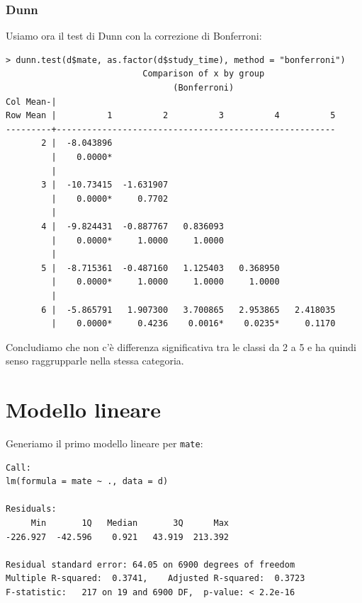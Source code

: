 \documentclass{beamer}
\begin{document}
\begin{frame}[fragile]
\frametitle{Dunn}
Usiamo ora il test di Dunn con la correzione di Bonferroni:
{\tiny
\begin{verbatim}
> dunn.test(d$mate, as.factor(d$study_time), method = "bonferroni")
                           Comparison of x by group                            
                                 (Bonferroni)                                  
Col Mean-|
Row Mean |          1          2          3          4          5
---------+-------------------------------------------------------
       2 |  -8.043896
         |    0.0000*
         |
       3 |  -10.73415  -1.631907
         |    0.0000*     0.7702
         |
       4 |  -9.824431  -0.887767   0.836093
         |    0.0000*     1.0000     1.0000
         |
       5 |  -8.715361  -0.487160   1.125403   0.368950
         |    0.0000*     1.0000     1.0000     1.0000
         |
       6 |  -5.865791   1.907300   3.700865   2.953865   2.418035
         |    0.0000*     0.4236    0.0016*    0.0235*     0.1170
\end{verbatim}
}
Concludiamo che non c'è differenza significativa tra le classi da 2 a 5 e ha quindi senso raggrupparle nella stessa categoria.
\end{frame}

\section{Modello lineare}

\begin{frame}[fragile]
Generiamo il primo modello lineare per \texttt{mate}:
{\scriptsize
\begin{verbatim}
Call:
lm(formula = mate ~ ., data = d)

Residuals:
     Min       1Q   Median       3Q      Max 
-226.927  -42.596    0.921   43.919  213.392

Residual standard error: 64.05 on 6900 degrees of freedom
Multiple R-squared:  0.3741,	Adjusted R-squared:  0.3723 
F-statistic:   217 on 19 and 6900 DF,  p-value: < 2.2e-16 
\end{verbatim}
}
\end{frame}
\end{document}
